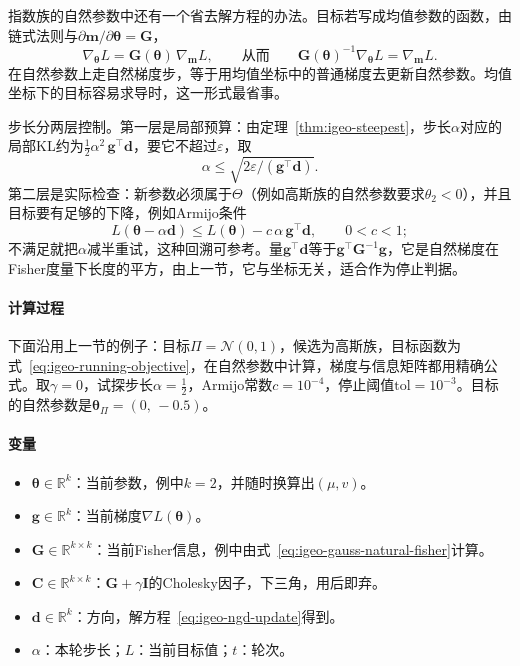 指数族的自然参数中还有一个省去解方程的办法。目标若写成均值参数的函数，由链式法则与$\partial\bm{m}/\partial\bm{\theta}=\bm{G}$，
\[
  \nabla_{\bm{\theta}}L=\bm{G}(\bm{\theta})\,\nabla_{\bm{m}}L,\qquad\text{从而}\qquad\bm{G}(\bm{\theta})^{-1}\nabla_{\bm{\theta}}L=\nabla_{\bm{m}}L .
\]
在自然参数上走自然梯度步，等于用均值坐标中的普通梯度去更新自然参数。均值坐标下的目标容易求导时，这一形式最省事。

步长分两层控制。第一层是局部预算：由定理~\ref{thm:igeo-steepest}，步长$\alpha$对应的局部KL约为$\frac12\alpha^{2}\,\bm{g}^{\top}\bm{d}$，要它不超过$\varepsilon$，取
\[
  \alpha\leq\sqrt{2\varepsilon/(\bm{g}^{\top}\bm{d})} .
\]
第二层是实际检查：新参数必须属于$\Theta$（例如高斯族的自然参数要求$\theta_2<0$），并且目标要有足够的下降，例如Armijo条件
\begin{equation}
  L(\bm{\theta}-\alpha\bm{d})\leq L(\bm{\theta})-c\,\alpha\,\bm{g}^{\top}\bm{d},\qquad0<c<1 ;
  \label{eq:igeo-armijo}
\end{equation}
不满足就把$\alpha$减半重试，这种回溯可参考。量$\bm{g}^{\top}\bm{d}$等于$\bm{g}^{\top}\bm{G}^{-1}\bm{g}$，它是自然梯度在Fisher度量下长度的平方，由上一节，它与坐标无关，适合作为停止判据。

\paragraph{计算过程}
下面沿用上一节的例子：目标$\Pi=\mathcal{N}(0,1)$，候选为高斯族，目标函数为式~\eqref{eq:igeo-running-objective}，在自然参数中计算，梯度与信息矩阵都用精确公式。取$\gamma=0$，试探步长$\alpha=\frac12$，Armijo常数$c=10^{-4}$，停止阈值$\mathrm{tol}=10^{-3}$。目标的自然参数是$\bm{\theta}_{\Pi}=(0,\,-0.5)$。

\paragraph{变量}
\begin{itemize}
  \item $\bm{\theta}\in\mathbb{R}^{k}$：当前参数，例中$k=2$，并随时换算出$(\mu,v)$。
  \item $\bm{g}\in\mathbb{R}^{k}$：当前梯度$\nabla L(\bm{\theta})$。
  \item $\bm{G}\in\mathbb{R}^{k\times k}$：当前Fisher信息，例中由式~\eqref{eq:igeo-gauss-natural-fisher}计算。
  \item $\bm{C}\in\mathbb{R}^{k\times k}$：$\bm{G}+\gamma\bm{I}$的Cholesky因子，下三角，用后即弃。
  \item $\bm{d}\in\mathbb{R}^{k}$：方向，解方程~\eqref{eq:igeo-ngd-update}得到。
  \item $\alpha$：本轮步长；$L$：当前目标值；$t$：轮次。
\end{itemize}

